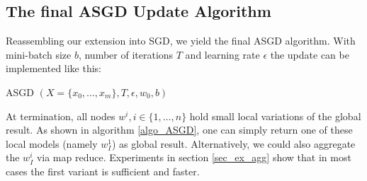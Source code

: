 \documentclass{acm_proc_article-sp}
\begin{document}
\subsection{The final ASGD Update Algorithm\label{sec_final}}
Reassembling our extension into SGD, we yield the final ASGD algorithm.
With mini-batch size $b$, number of iterations $T$ 
and learning rate $\epsilon$ the update can be implemented like this:
\begin{algorithm}
\caption{ASGD $(X=\{x_0,\dots,x_m\},T,\epsilon,w_0,b)$}
\label{algo_ASGD}
\begin{algorithmic}[1]
\EndFor
\EndFor
{}
\end{algorithmic}

\end{algorithm}
At termination, all nodes $w^i, i \in \{1,\dots,n\}$ hold small local 
variations of the global
result. As shown in algorithm \ref{algo_ASGD}, one can simply return 
one of these local models (namely $w^1_I$) as global result. 
Alternatively, we could also aggregate the $w^i_I$ via map reduce.
Experiments in section \ref{sec_ex_agg} show that in most cases the first variant is 
sufficient and faster. 
\end{document}
